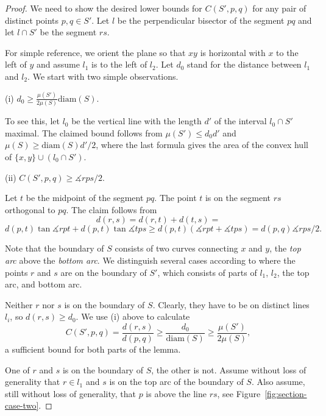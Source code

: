 \documentclass[12pt]{article}
\theoremstyle{plain}
\theoremstyle{definition}
\theoremstyle{remark}
\def\diam{\mathrm{diam}}
\begin{document}
\begin{proof}
We need to show the desired lower bounds for $C(S',p,q)$ for any pair of distinct points $p,q\in S'$. Let $l$ be the perpendicular bisector of the segment $pq$ and let $l\cap S'$ be the segment $rs$.

For simple reference, we orient the plane so that $xy$ is horizontal with $x$ to the left of $y$ and assume $l_1$ is to the left of $l_2$. Let $d_0$ stand for the distance between $l_1$ and $l_2$. We start with two simple observations.

(i) $d_0\ge\frac{\mu(S')}{2\mu(S)}\diam(S)$. 

\noindent To see this, let $l_0$ be the vertical line with the length $d'$ of the interval $l_0\cap S'$ maximal. The claimed bound follows from $\mu(S')\le d_0d'$ and $\mu(S)\ge\diam(S)d'/2$, where the last formula gives the area of the convex hull of $\{x,y\}\cup(l_0\cap S')$.

(ii) $C(S',p,q)\ge\measuredangle rps/2$.

\noindent Let $t$ be the midpoint of the segment $pq$. The point $t$ is on the segment $rs$ orthogonal to $pq$. The claim follows from $$d(r,s)=d(r,t)+d(t,s)=$$ $$d(p,t)\tan\measuredangle rpt+d(p,t)\tan\measuredangle tps\ge d(p,t)(\measuredangle rpt+\measuredangle tps)=d(p,q)\measuredangle rps/2.$$

Note that the boundary of $S$ consists of two curves connecting $x$ and $y$, the \emph{top arc} above the \emph{bottom arc}. We distinguish several cases according to where the points $r$ and $s$ are on the boundary of $S'$, which consists of parts of $l_1$, $l_2$, the top arc, and bottom arc.
\smallskip

 Neither $r$ nor $s$ is on the boundary of $S$. Clearly, they have to be on distinct lines $l_i$, so $d(r,s)\ge d_0$. We use (i) above to calculate
$$C(S',p,q)=\frac{d(r,s)}{d(p,q)}\ge\frac{d_0}{\diam(S)}\ge\frac{\mu(S')}{2\mu(S)},$$
a sufficient bound for both parts of the lemma.
\smallskip

 One of $r$ and $s$ is on the boundary of $S$, the other is not. Assume without loss of generality that $r\in l_1$ and $s$ is on the top arc of the boundary of $S$. Also assume, still without loss of generality, that $p$ is above the line $rs$, see Figure~\ref{fig:section-case-two}.


\end{proof}
\end{document}

